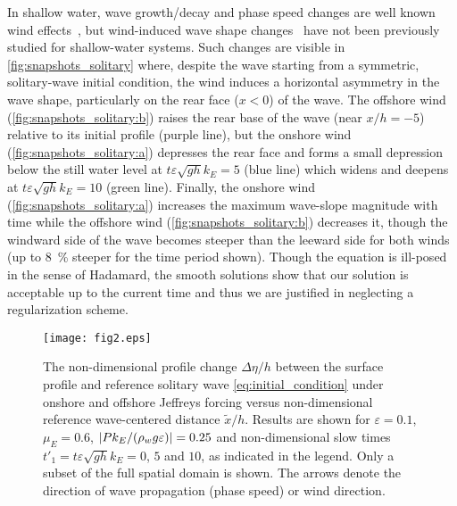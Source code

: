 \documentclass{jfm}
\renewcommand*{\epsilon}{\varepsilon}
\begin{document}
In shallow water, wave growth/decay and phase speed changes are well
known wind effects~\citep[\eg][]{miles1957generation,cavaleri1981wind},
but wind-induced wave shape changes~\citep{zdyrski2020wind} have not
been previously studied for shallow-water systems.
Such changes are visible in \cref{fig:snapshots_solitary} where, despite
the wave starting from a symmetric, solitary-wave initial condition, the
wind induces a horizontal asymmetry in the wave shape, particularly on
the rear face ($x<0$) of the wave.
The offshore wind (\cref{fig:snapshots_solitary:b}) raises the
rear base of the wave (near $x/h = -5$) relative to its initial profile
(purple line), but the onshore wind (\cref{fig:snapshots_solitary:a})
depresses the rear face and forms a small depression below the still
water level at $t\epsilon \sqrt{gh} k_E=5$ (blue line) which widens and
deepens at $t\epsilon \sqrt{gh} k_E=10$ (green line).
Finally, the onshore wind (\cref{fig:snapshots_solitary:a})
increases the maximum wave-slope magnitude with time while the offshore
wind (\cref{fig:snapshots_solitary:b}) decreases it, though the windward
side of the wave becomes steeper than the leeward side for both winds
(up to \SI{8}{\percent} steeper for the time period shown).
Though the equation is ill-posed in the sense of Hadamard, the smooth
solutions show that our solution is acceptable up to the current time
and thus we are justified in neglecting a regularization scheme.

\begin{figure}
  \centering
  { %
    \label{fig:snapshots_solitary_tail:a}
    \label{fig:snapshots_solitary_tail:b}
  }
  \texttt{[image: fig2.eps]}
  \caption{
    The non-dimensional profile change $\Delta \eta/h$ between the
    surface profile and reference solitary wave
    \cref{eq:initial_condition} under
     onshore and
     offshore Jeffreys forcing
    versus non-dimensional reference wave-centered distance
    $\tilde{x}/h$.
    Results are shown for $\epsilon=0.1$, $\mu_E = 0.6$, $\abs{P
    k_E/(\rho_w g \epsilon)} = 0.25$ and non-dimensional slow times
    $t'_1 = t \epsilon \sqrt{gh} k_E = 0$, $5$ and $10$, as indicated
    in the legend.
    Only a subset of the full spatial domain is shown.
    The arrows denote the direction of wave propagation (phase speed) or
    wind direction.
  }\label{fig:snapshots_solitary_tail}
\end{figure}
\end{document}
